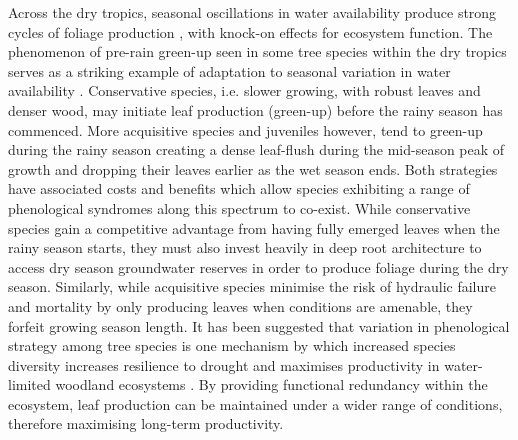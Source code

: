 \documentclass[11pt,a4paper]{article}
\begin{document}
Across the dry tropics, seasonal oscillations in water availability produce strong cycles of foliage production \citep{Chidumayo2001, Dahlin2016}, with knock-on effects for ecosystem function. The phenomenon of pre-rain green-up seen in some tree species within the dry tropics serves as a striking example of adaptation to seasonal variation in water availability \citep{Ryan2017}. Conservative species, i.e. slower growing, with robust leaves and denser wood, may initiate leaf production (green-up) before the rainy season has commenced. More acquisitive species and juveniles however, tend to green-up during the rainy season creating a dense leaf-flush during the mid-season peak of growth and dropping their leaves earlier as the wet season ends. Both strategies have associated costs and benefits which allow species exhibiting a range of phenological syndromes along this spectrum to co-exist. While conservative species gain a competitive advantage from having fully emerged leaves when the rainy season starts, they must also invest heavily in deep root architecture to access dry season groundwater reserves in order to produce foliage during the dry season. Similarly, while acquisitive species minimise the risk of hydraulic failure and mortality by only producing leaves when conditions are amenable, they forfeit growing season length. It has been suggested that variation in phenological strategy among tree species is one mechanism by which increased species diversity increases resilience to drought and maximises productivity in water-limited woodland ecosystems \citep{Stan2019, Morellato2016}. By providing functional redundancy within the ecosystem, leaf production can be maintained under a wider range of conditions, therefore maximising long-term productivity.
\end{document}
